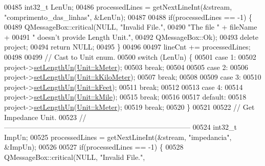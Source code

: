 \begin{DoxyCode}
00485   int32\_t LenUn;
00486   processedLines = getNextLineInt(&stream, \textcolor{stringliteral}{"comprimento\_das\_linhas"}, &LenUn);
00487 
00488   \textcolor{keywordflow}{if}(processedLines == -1) \{
00489     QMessageBox::critical(NULL, \textcolor{stringliteral}{"Invalid File."},
00490                           \textcolor{stringliteral}{"The file "} + fileName +
00491                           \textcolor{stringliteral}{" doesn't provide Length Unit."},
00492                           QMessageBox::Ok);
00493     \textcolor{keyword}{delete} project;
00494     \textcolor{keywordflow}{return} NULL;
00495   \}
00496 
00497   lineCnt += processedLines;
00498 
00499 \textcolor{comment}{// Cast to Unit enum.}
00500   \textcolor{keywordflow}{switch} (LenUn) \{
00501   \textcolor{keywordflow}{case} 1:
00502     project->\hyperlink{class_project_a846ee2284b0856d461b35d78d9f8e1d6}{setLengthUn}(\hyperlink{class_unit_a8c8921f7b225ad6063b1cb573425b9a0abfa41ebe7ee649a1f02c9b8ae570434b}{Unit::kMeter});
00503     \textcolor{keywordflow}{break};
00504 
00505   \textcolor{keywordflow}{case} 2:
00506     project->\hyperlink{class_project_a846ee2284b0856d461b35d78d9f8e1d6}{setLengthUn}(\hyperlink{class_unit_a8c8921f7b225ad6063b1cb573425b9a0a1c04f3dd196dbe1832a2658215b0d919}{Unit::kKiloMeter});
00507     \textcolor{keywordflow}{break};
00508 
00509   \textcolor{keywordflow}{case} 3:
00510     project->\hyperlink{class_project_a846ee2284b0856d461b35d78d9f8e1d6}{setLengthUn}(\hyperlink{class_unit_a8c8921f7b225ad6063b1cb573425b9a0a9ac9b167b0ebce477fb53d6ace04ddc8}{Unit::kFeet});
00511     \textcolor{keywordflow}{break};
00512 
00513   \textcolor{keywordflow}{case} 4:
00514     project->\hyperlink{class_project_a846ee2284b0856d461b35d78d9f8e1d6}{setLengthUn}(\hyperlink{class_unit_a8c8921f7b225ad6063b1cb573425b9a0a2ebde742068bbee0510de32fbb4cd724}{Unit::kMile});
00515     \textcolor{keywordflow}{break};
00516 
00517   \textcolor{keywordflow}{default}:
00518     project->\hyperlink{class_project_a846ee2284b0856d461b35d78d9f8e1d6}{setLengthUn}(\hyperlink{class_unit_a8c8921f7b225ad6063b1cb573425b9a0abfa41ebe7ee649a1f02c9b8ae570434b}{Unit::kMeter});
00519     \textcolor{keywordflow}{break};
00520   \}
00521 
00522 \textcolor{comment}{// Get Impedance Unit.}
00523 \textcolor{comment}{//------------------------------------------------------------------------------}
00524   int32\_t ImpUn;
00525   processedLines = getNextLineInt(&stream, \textcolor{stringliteral}{"impedancia"}, &ImpUn);
00526 
00527   \textcolor{keywordflow}{if}(processedLines == -1) \{
00528     QMessageBox::critical(NULL, \textcolor{stringliteral}{"Invalid File."},

\end{DoxyCode}
